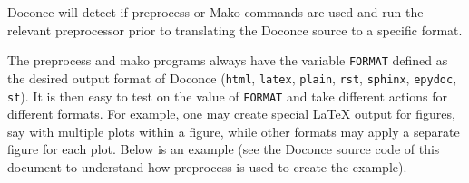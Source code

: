 \documentclass[a4paper]{article}
\begin{document}
Doconce will detect if preprocess or Mako commands are used and run
the relevant preprocessor prior to translating the Doconce source to a
specific format.

The preprocess and mako programs always have the variable \texttt{FORMAT}
defined as the desired output format of Doconce (\texttt{html}, \texttt{latex},
\texttt{plain}, \texttt{rst}, \texttt{sphinx}, \texttt{epydoc}, \texttt{st}).  It is then easy to test on
the value of \texttt{FORMAT} and take different actions for different
formats. For example, one may create special LaTeX output for figures,
say with multiple plots within a figure, while other formats may apply
a separate figure for each plot. Below is an example (see the Doconce
source code of this document to understand how preprocess is used to
create the example).


\end{document}
